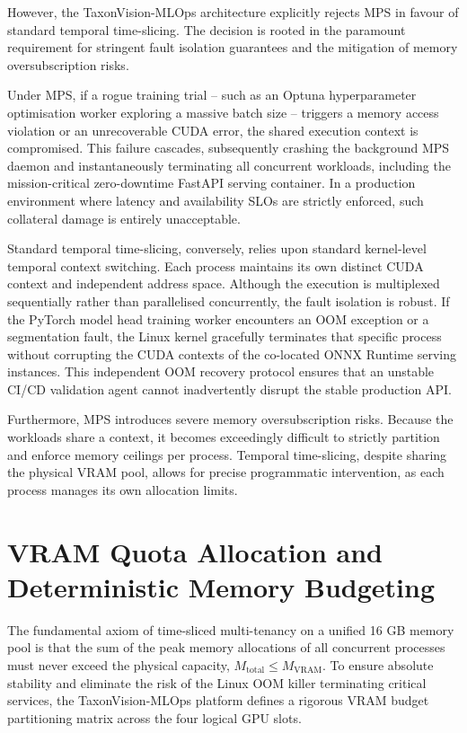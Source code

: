 However, the TaxonVision-MLOps architecture explicitly rejects MPS in favour of standard temporal time-slicing. The decision is rooted in the paramount requirement for stringent fault isolation guarantees and the mitigation of memory oversubscription risks.

Under MPS, if a rogue training trial -- such as an Optuna hyperparameter optimisation worker exploring a massive batch size -- triggers a memory access violation or an unrecoverable CUDA error, the shared execution context is compromised. This failure cascades, subsequently crashing the background MPS daemon and instantaneously terminating all concurrent workloads, including the mission-critical zero-downtime FastAPI serving container. In a production environment where latency and availability SLOs are strictly enforced, such collateral damage is entirely unacceptable.

Standard temporal time-slicing, conversely, relies upon standard kernel-level temporal context switching. Each process maintains its own distinct CUDA context and independent address space. Although the execution is multiplexed sequentially rather than parallelised concurrently, the fault isolation is robust. If the PyTorch model head training worker encounters an OOM exception or a segmentation fault, the Linux kernel gracefully terminates that specific process without corrupting the CUDA contexts of the co-located ONNX Runtime serving instances. This independent OOM recovery protocol ensures that an unstable CI/CD validation agent cannot inadvertently disrupt the stable production API.

Furthermore, MPS introduces severe memory oversubscription risks. Because the workloads share a context, it becomes exceedingly difficult to strictly partition and enforce memory ceilings per process. Temporal time-slicing, despite sharing the physical VRAM pool, allows for precise programmatic intervention, as each process manages its own allocation limits.

\section{VRAM Quota Allocation and Deterministic Memory Budgeting}
\label{sec:vram_quota_allocation}

The fundamental axiom of time-sliced multi-tenancy on a unified 16 GB memory pool is that the sum of the peak memory allocations of all concurrent processes must never exceed the physical capacity, $M_{\text{total}} \le M_{\text{VRAM}}$. To ensure absolute stability and eliminate the risk of the Linux OOM killer terminating critical services, the TaxonVision-MLOps platform defines a rigorous VRAM budget partitioning matrix across the four logical GPU slots.

